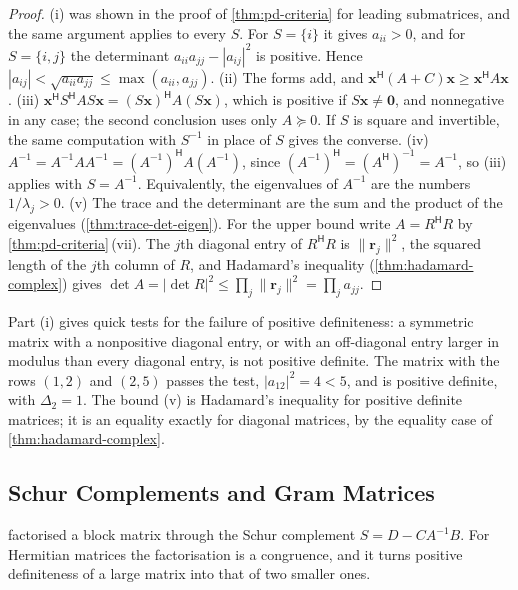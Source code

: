 \begin{proof}
(i) was shown in the proof of \cref{thm:pd-criteria} for leading submatrices, and the same argument applies to every $S$. For $S=\{i\}$ it gives $a_{ii}>0$, and for $S=\{i,j\}$ the determinant $a_{ii}a_{jj}-|a_{ij}|^2$ is positive. Hence $|a_{ij}|<\sqrt{a_{ii}a_{jj}}\le\max(a_{ii},a_{jj})$. (ii) The forms add, and $\mathbf x^{\mathsf H}(A+C)\mathbf x\ge\mathbf x^{\mathsf H}A\mathbf x$. (iii) $\mathbf x^{\mathsf H}S^{\mathsf H}AS\mathbf x=(S\mathbf x)^{\mathsf H}A(S\mathbf x)$, which is positive if $S\mathbf x\ne\mathbf 0$, and nonnegative in any case; the second conclusion uses only $A\succeq0$. If $S$ is square and invertible, the same computation with $S^{-1}$ in place of $S$ gives the converse. (iv) $A^{-1}=A^{-1}AA^{-1}=(A^{-1})^{\mathsf H}A(A^{-1})$, since $(A^{-1})^{\mathsf H}=(A^{\mathsf H})^{-1}=A^{-1}$, so (iii) applies with $S=A^{-1}$. Equivalently, the eigenvalues of $A^{-1}$ are the numbers $1/\lambda_j>0$. (v) The trace and the determinant are the sum and the product of the eigenvalues (\cref{thm:trace-det-eigen}). For the upper bound write $A=R^{\mathsf H}R$ by \cref{thm:pd-criteria}\,(vii). The $j$th diagonal entry of $R^{\mathsf H}R$ is $\|\mathbf r_j\|^2$, the squared length of the $j$th column of $R$, and Hadamard's inequality (\cref{thm:hadamard-complex}) gives $\det A=|\det R|^2\le\prod_j\|\mathbf r_j\|^2=\prod_ja_{jj}$.
\end{proof}

Part (i) gives quick tests for the failure of positive definiteness: a symmetric matrix with a nonpositive diagonal entry, or with an off-diagonal entry larger in modulus than every diagonal entry, is not positive definite. The matrix with the rows $(1,2)$ and $(2,5)$ passes the test, $|a_{12}|^2=4<5$, and is positive definite, with $\Delta_2=1$. The bound (v) is Hadamard's inequality for positive definite matrices; it is an equality exactly for diagonal matrices, by the equality case of \cref{thm:hadamard-complex}.

\subsection{Schur Complements and Gram Matrices}

 factorised a block matrix through the Schur complement $S=D-CA^{-1}B$. For Hermitian matrices the factorisation is a congruence, and it turns positive definiteness of a large matrix into that of two smaller ones.

